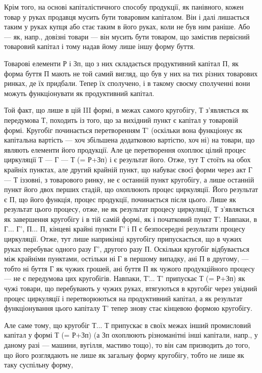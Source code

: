 Крім того, на основі капіталістичного способу продукції, як панівного, кожен товар у руках продавця
мусить бути товаровим капіталом. Він і далі лишається таким у руках купця або стає таким в його
руках, коли не був ним раніше. Або — як, напр., довізні товари — він мусить бути товаром, що
замістив первісний товаровий капітал і тому надав йому лише іншу форму буття.

Товарові елементи Р і Зп, що з них складається продуктивний капітал П, як форма буття П мають не той
самий вигляд, що був у них на тих різних товарових ринках, де їх придбали. Тепер їх сполучено, і в
такому своєму сполученні вони можуть функціонувати як продуктивний капітал.

Той факт, що лише в цій III формі, в межах самого кругобігу, Т з’являється як передумова Т, походить
із того, що за вихідний пункт є капітал у товаровій формі. Кругобіг починається перетворенням Т'
(оскільки вона функціонує як капітальна вартість — хоч збільшена додатковою вартістю, хоч ні) на
товари, що являють елементи його продукції. Але це перетворення охоплює цілий процес циркуляції Т —
Г — Т (= Р+Зп) і є результат його. Отже, тут Т стоїть на обох крайніх пунктах, але другий крайній
пункт, що набуває своєї форми через акт Г
— Т іззовні, з товарового ринку, не є останній пункт кругобігу, а лише останній пункт його двох
перших стадій, що охоплюють процес циркуляції. Його результат є П, що його функція, процес
продукції, починається після цього. Лише як результат цього процесу, отже, не як результат процесу
циркуляції, Т з’являється як завершення кругобігу і в тій самій формі, як і початковий пункт Т'.
Навпаки, в Г... Г', П... П, кінцеві крайні пункти Г' і П є безпосередні результати процесу
циркуляції. Отже, тут лише наприкінці кругобігу припускається, що в чужих руках перебуває одного
разу Г', другого разу П. Оскільки кругобіг відбувається між крайніми пунктами, остільки ні Г в
першому випадку, ані П в другому, — тобто ні буття Г як чужих грошей, ані буття П як чужого
продукційного процесу — не є передумова цих кругобігів. Навпаки, Т'... Т' припускає Т (= Р+Зп) як
чужі товари,
що перебувають у чужих руках, втягуються в кругобіг через увідний процес циркуляції і перетворюються
на продуктивний капітал, а як результат функціонування цього капіталу Т' тепер знову стає кінцевою
формою кругобігу.

Але саме тому, що кругобіг Т... Т припускає в своїх межах інший промисловий капітал у формі Т (=
Р+Зп) (а Зп охоплюють різноманітні інші капітали, напр., у даному разі — машини, вугілля, мастиво
тощо), то він сам призводить до того, що його розглядають не лише як загальну форму кругобігу, тобто
не лише як таку суспільну форму,
\parbreak{}  %
